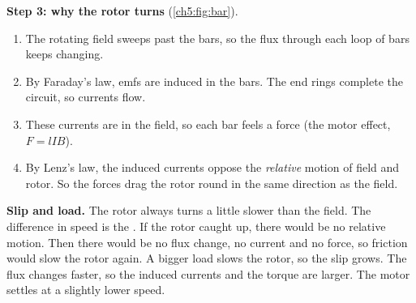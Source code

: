 \begin{sidebyside}[0.36]
  \centering
  \label{ch5:fig:bar}
\nextside
  \textbf{Step 3: why the rotor turns} (\cref{ch5:fig:bar}).
  \begin{enumerate}
    \item The rotating field sweeps past the bars, so the flux through each loop of
          bars keeps changing.
    \item By Faraday's law, emfs are induced in the bars. The end rings complete the
          circuit, so currents flow.
    \item These currents are in the field, so each bar feels a force (the motor
          effect, $F = lIB$).
    \item By Lenz's law, the induced currents oppose the \emph{relative} motion of
          field and rotor. So the forces drag the rotor round in the same direction as
          the field.
  \end{enumerate}
\end{sidebyside}

\textbf{Slip and load.} The rotor always turns a little slower than the field. The
difference in speed is the . If the rotor caught up, there would be no
relative motion. Then there would be no flux change, no current and no force, so
friction would slow the rotor again. A bigger load slows the rotor, so the slip grows.
The flux changes faster, so the induced currents and the torque are larger. The motor
settles at a slightly lower speed.

